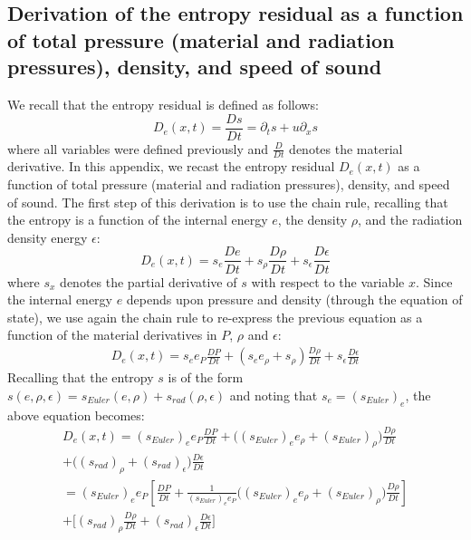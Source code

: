 \documentclass[review]{elsarticle}
\begin{document}
\begin{appendices}
\section{Derivation of the entropy residual as a function of total pressure (material and radiation pressures), density, and speed of sound}
\label{app:appendixC}
%
We recall that the entropy residual is defined as follows:
\begin{equation}\label{app:ent}
D_e(x,t) = \frac{D s}{Dt} = \partial_t s + u \partial_x s
\end{equation}
where all variables were defined previously and $\frac{D}{Dt}$ denotes the material derivative. In this appendix, we recast the entropy residual $D_e(x,t)$ as a function of total pressure (material and radiation pressures), density, and speed of sound. The first step of this derivation is to use the chain rule, recalling that the entropy is a function of the internal energy $e$, the density $\rho$, and the radiation density energy $\epsilon$:
%
\begin{equation}\label{app:ent2}
D_e(x,t) = s_e \frac{D e}{Dt} + s_\rho \frac{D \rho}{Dt} + s_\epsilon \frac{D \epsilon}{Dt} \nonumber
\end{equation}
% 
where $s_x$ denotes the partial derivative of $s$ with respect to the variable $x$. Since the internal energy $e$ depends upon pressure and density (through the equation of state), we use again the chain rule to re-express the previous equation as a function of the material derivatives in $P$, $\rho$ and $\epsilon$:
%
\begin{align}
D_e(x,t) = s_e e_P \frac{D P}{Dt} + ( s_e e_\rho + s_\rho ) \frac{D \rho}{Dt} + s_\epsilon \frac{D \epsilon}{Dt} \nonumber
\end{align}
%
Recalling that the entropy $s$ is of the form $s(e,\rho,\epsilon) = s_{Euler}(e,\rho) + s_{rad}(\rho,\epsilon)$ and noting that $s_e = (s_{Euler})_e$, the above equation becomes:
%
\begin{multline}\label{app:ent3}
D_e(x,t) = (s_{Euler})_e e_P \frac{D P}{Dt} + \Big( (s_{Euler})_e e_\rho + (s_{Euler})_\rho \Big) \frac{D \rho}{Dt} \\ + \Big( (s_{rad})_\rho + (s_{rad})_\epsilon \Big) \frac{D \epsilon}{Dt} \\
= (s_{Euler})_e e_P\left[ \frac{D P}{Dt} + \frac{1}{(s_{Euler})_e e_P}\Big( (s_{Euler})_e e_\rho + (s_{Euler})_\rho \Big) \frac{D \rho}{Dt} \right] \\ + \Big[ (s_{rad})_\rho \frac{D \rho}{Dt} + (s_{rad})_\epsilon \frac{D \epsilon}{Dt} \Big]

\end{multline}
\end{appendices}
\end{document}
